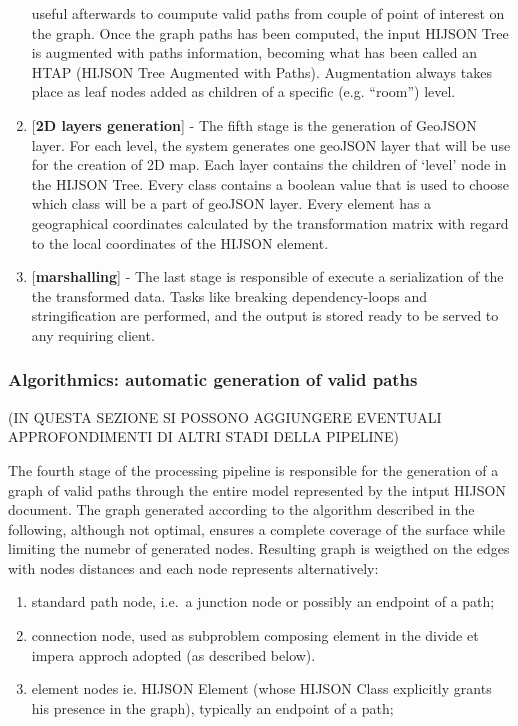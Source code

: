 \documentclass[]{article}
\begin{document}
\begin{enumerate}
  useful afterwards to coumpute valid paths from couple of point of
  interest on the graph. Once the graph paths has been computed, the
  input HIJSON Tree is augmented with paths information, becoming what
  has been called an HTAP (HIJSON Tree Augmented with Paths).
  Augmentation always takes place as leaf nodes added as children of a
  specific (e.g. ``room'') level.
\item
  {[}\textbf{2D layers generation}{]} - The fifth stage is the
  generation of GeoJSON layer. For each level, the system generates one
  geoJSON layer that will be use for the creation of 2D map. Each layer
  contains the children of `level' node in the HIJSON Tree. Every class
  contains a boolean value that is used to choose which class will be a
  part of geoJSON layer. Every element has a geographical coordinates
  calculated by the transformation matrix with regard to the local
  coordinates of the HIJSON element.
\item
  {[}\textbf{marshalling}{]} - The last stage is responsible of execute
  a serialization of the the transformed data. Tasks like breaking
  dependency-loops and stringification are performed, and the output is
  stored ready to be served to any requiring client.
\end{enumerate}

\subsubsection{Algorithmics: automatic generation of valid
paths}\label{algorithmics-automatic-generation-of-valid-paths}

(IN QUESTA SEZIONE SI POSSONO AGGIUNGERE EVENTUALI APPROFONDIMENTI DI
ALTRI STADI DELLA PIPELINE)

The fourth stage of the processing pipeline is responsible for the
generation of a graph of valid paths through the entire model
represented by the intput HIJSON document. The graph generated according
to the algorithm described in the following, although not optimal,
ensures a complete coverage of the surface while limiting the numebr of
generated nodes. Resulting graph is weigthed on the edges with nodes
distances and each node represents alternatively:

\begin{enumerate}
\def\labelenumi{\alph{enumi}.}
\itemsep1pt\parskip0pt
\item
  standard path node, i.e.~a junction node or possibly an endpoint of a
  path;
\item
  connection node, used as subproblem composing element in the divide et
  impera approch adopted (as described below).
\item
  element nodes ie. HIJSON Element (whose HIJSON Class explicitly grants
  his presence in the graph), typically an endpoint of a path;
\end{enumerate}
\end{document}

